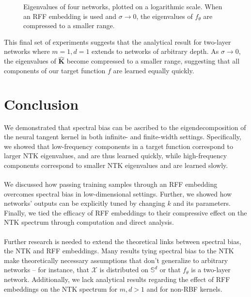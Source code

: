 \documentclass[11pt]{article}
\newcommand{\X}{\mathcal{X}}
\begin{document}
\begin{figure}[h]
\centering 
{} 
\caption{Eigenvalues of four networks, plotted on a logarithmic scale. When an RFF embedding is used and $\sigma \rightarrow 0$, the eigenvalues of $f_\theta$ are compressed to a smaller range.} \label{fig:multiimage} 
\end{figure}

\noindent This final set of experiments suggests that the analytical result for two-layer networks where $m = 1, d = 1$ extends to networks of arbitrary depth. As $\sigma \rightarrow 0$, the eigenvalues of $\hat{\mathbf{K}}$ become compressed to a smaller range, suggesting that all components of our target function $f$ are learned equally quickly. 
\section{Conclusion}
We demonstrated that spectral bias can be ascribed to the eigendecomposition of the neural tangent kernel in both infinite- and finite-width settings. Specifically, we showed that low-frequency components in a target function correspond to larger NTK eigenvalues, and are thus learned quickly, while high-frequency components correspond to smaller NTK eigenvalues and are learned slowly.\\
\\
We discussed how passing training samples through an RFF embedding overcomes spectral bias in low-dimensional settings. Further, we showed how networks' outputs can be explicitly tuned by changing $k$ and its parameters. Finally, we tied the efficacy of RFF embeddings to their compressive effect on the NTK spectrum through computation and direct analysis.\\
\\
Further research is needed to extend the theoretical links between spectral bias, the NTK and RFF embeddings. Many results tying spectral bias to the NTK make theoretically necessary assumptions that don't generalize to arbitrary networks – for instance, that $\X$ is distributed on $\mathbb{S}^d$ or that $f_\theta$ is a two-layer network. Additionally, we lack analytical results regarding the effect of RFF embeddings on the NTK spectrum for $m, d > 1$ and for non-RBF kernels.


{}
\end{document}
